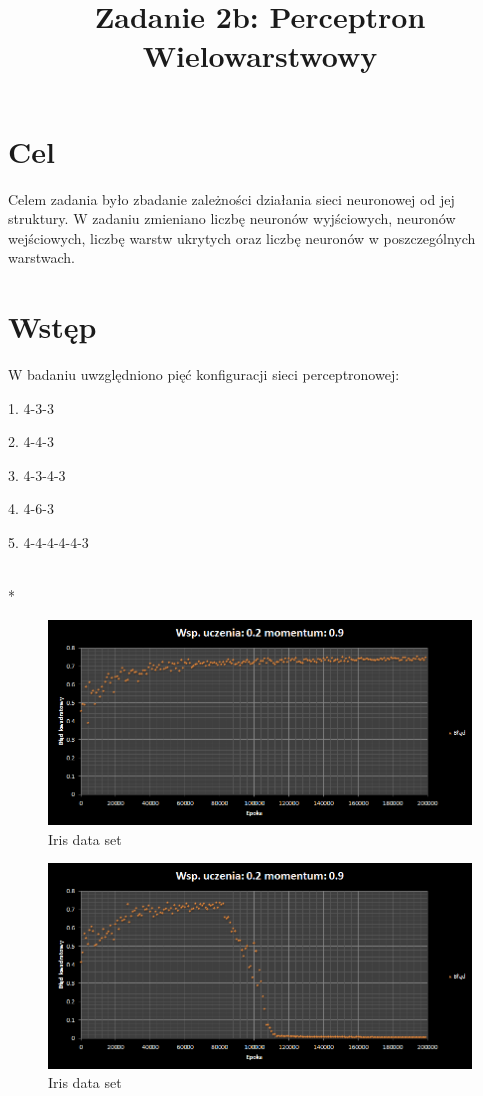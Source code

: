 \documentclass{classrep}
\author{
  \studentinfo{Łukasz Ochmański}{183566} \and
  \studentinfo{Przemysław Szwajkowski}{173524}
}
\title{Zadanie 2b: Perceptron Wielowarstwowy}
\begin{document}
\maketitle


\section{Cel}
Celem zadania było zbadanie zależności działania sieci neuronowej od jej struktury.
W zadaniu zmieniano liczbę neuronów wyjściowych, neuronów wejściowych, liczbę warstw ukrytych oraz liczbę neuronów w poszczególnych warstwach.

\section{Wstęp}
W badaniu uwzględniono pięć konfiguracji sieci perceptronowej:
\item
1. 4-3-3
\item
2. 4-4-3
\item
3. 4-3-4-3
\item
4. 4-6-3
\item
5. 4-4-4-4-4-3

\\*

\begin{figure}[ht]
\centering
			\includegraphics[scale=0.65]{pictures/Iris01.png}
	\caption{Iris data set}
	\label{fig:Iris data set}
\end{figure}

\begin{figure}[ht]
\centering
			\includegraphics[scale=0.65]{pictures/Iris02.png}
	\caption{Iris data set}
	\label{fig:Iris data set}
\end{figure}
\end{document}
